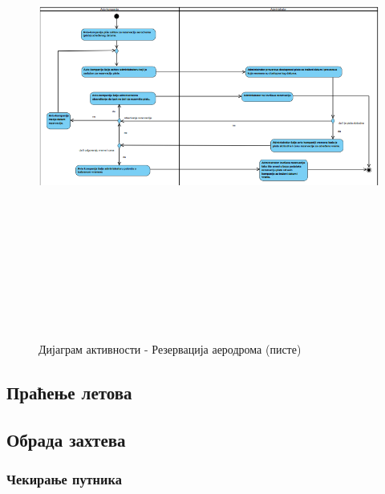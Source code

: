 \documentclass{article}
\begin{document}
\newpage
\begin{figure}[H]
    \centering
    \includegraphics[width=1.1\textwidth, height=16cm]{Dijagrami_slike/rezervacija_aerodroma.png}
    \caption{Дијаграм активности - Резервација аеродрома (писте)}
\end{figure}

\newpage
\subsection{Праћење летова}

\newpage
\subsection{Обрада захтева}

\subsubsection{Чекирање путника}
\end{document}
